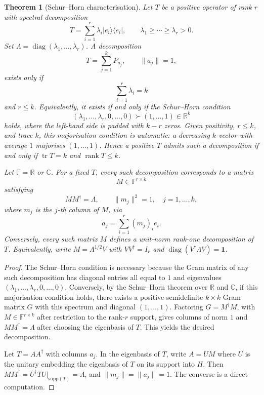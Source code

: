 \documentclass[
  twocolumn,
  aps,
  pra,
  floatfix,
  amsmath,amssymb,
  longbibliography
]{revtex4-2}
\newtheorem{theorem}{Theorem}
\theoremstyle{definition}
\theoremstyle{remark}
\begin{document}
\begin{theorem}[Schur--Horn characterisation]\label{thm:canonical}
Let \(T\) be a positive operator of rank \(r\) with spectral decomposition
\[
T=\sum_{i=1}^r \lambda_i |e_i\rangle\langle e_i|,
\qquad
\lambda_1\ge\cdots\ge\lambda_r>0.
\]
Set \(\Lambda=\operatorname{diag}(\lambda_1,\ldots,\lambda_r)\). A decomposition
\[
T=\sum_{j=1}^k P_{a_j},
\qquad
\|a_j\|=1,
\]
exists only if
\[
\sum_{i=1}^r \lambda_i=k
\]
and \(r\le k\).  Equivalently, it exists if and only if the Schur--Horn condition
\[
(\lambda_1,\ldots,\lambda_r,0,\ldots,0)\succ (1,\ldots,1)\in\mathbb R^k
\]
holds, where the left-hand side is padded with \(k-r\) zeros.
Given positivity, $r\le k$, and trace $k$, this majorisation condition is
automatic: a decreasing $k$-vector with average $1$ majorises
$(1,\ldots,1)$.  Hence a positive $T$ admits such a decomposition if
and only if $\operatorname{tr}T=k$ and $\operatorname{rank}T\le k$.

Let \(\mathbb F=\mathbb R\) or \(\mathbb C\). For a fixed \(T\), every such decomposition corresponds to a matrix
\[
M\in\mathbb F^{r\times k}
\]
satisfying
\[
MM^\dagger=\Lambda,
\qquad
\|m_j\|^2=1,\quad j=1,\ldots,k,
\]
where \(m_j\) is the \(j\)-th column of \(M\), via
\[
a_j=\sum_{i=1}^r (m_j)_i e_i.
\]
Conversely, every such matrix \(M\) defines a unit-norm rank-one decomposition of \(T\).
Equivalently, write $M=\Lambda^{1/2}V$ with
$VV^\dagger=I_r$ and $\operatorname{diag}(V^\dagger\Lambda V)=\mathbf1$.
\end{theorem}

\begin{proof}
The Schur--Horn condition is necessary because the Gram matrix of any such decomposition has diagonal entries all equal to \(1\) and eigenvalues \((\lambda_1,\ldots,\lambda_r,0,\ldots,0)\). Conversely, by the Schur--Horn theorem over \(\mathbb{R}\) and \(\mathbb{C}\), if this majorisation condition holds, there exists a positive semidefinite \(k\times k\) Gram matrix \(G\) with this spectrum and diagonal \((1,\ldots,1)\). Factoring \(G=M^\dagger M\), with \(M\in\mathbb F^{r\times k}\) after restriction to the rank-\(r\) support, gives columns of norm \(1\) and \(MM^\dagger=\Lambda\) after choosing the eigenbasis of \(T\). This yields the desired decomposition.

Let $T=AA^\dagger$ with columns $a_j$.  In the eigenbasis of $T$,
write $A=UM$ where $U$ is the unitary embedding the eigenbasis of $T$
on its support into $H$.  Then
$MM^\dagger=U^\dagger TU\big|_{\mathrm{supp}(T)}=\Lambda$, and
$\|m_j\|=\|a_j\|=1$.  The converse is a direct computation.
\end{proof}
\end{document}
